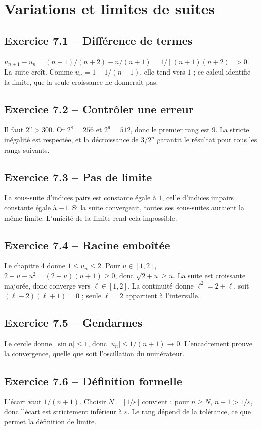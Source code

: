\chapter{Variations et limites de suites}
\section*{Exercice 7.1 -- Différence de termes}
$u_{n+1}-u_n=(n+1)/(n+2)-n/(n+1)=1/[(n+1)(n+2)]>0$. La suite croît. Comme $u_n=1-1/(n+1)$, elle tend vers $1$ ; ce calcul identifie la limite, que la seule croissance ne donnerait pas.

\section*{Exercice 7.2 -- Contrôler une erreur}
Il faut $2^n>300$. Or $2^8=256$ et $2^9=512$, donc le premier rang est $9$. La stricte inégalité est respectée, et la décroissance de $3/2^n$ garantit le résultat pour tous les rangs suivants.

\section*{Exercice 7.3 -- Pas de limite}
La sous-suite d'indices pairs est constante égale à $1$, celle d'indices impairs constante égale à $-1$. Si la suite convergeait, toutes ses sous-suites auraient la même limite. L'unicité de la limite rend cela impossible.

\section*{Exercice 7.4 -- Racine emboîtée}
Le chapitre 4 donne $1\le u_n\le2$. Pour $u\in[1,2]$, $2+u-u^2=(2-u)(u+1)\ge0$, donc $\sqrt{2+u}\ge u$. La suite est croissante majorée, donc converge vers $\ell\in[1,2]$. La continuité donne $\ell^2=2+\ell$, soit $(\ell-2)(\ell+1)=0$ ; seule $\ell=2$ appartient à l'intervalle.

\section*{Exercice 7.5 -- Gendarmes}
Le cercle donne $|\sin n|\le1$, donc $|u_n|\le1/(n+1)\to0$. L'encadrement prouve la convergence, quelle que soit l'oscillation du numérateur.

\section*{Exercice 7.6 -- Définition formelle}
L'écart vaut $1/(n+1)$. Choisir $N=\lceil1/\varepsilon\rceil$ convient : pour $n\ge N$, $n+1>1/\varepsilon$, donc l'écart est strictement inférieur à $\varepsilon$. Le rang dépend de la tolérance, ce que permet la définition de limite.
